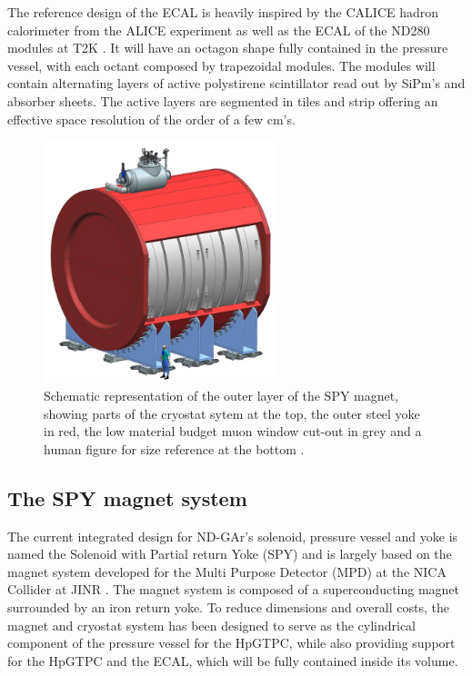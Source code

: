The reference design of the ECAL is heavily inspired by the CALICE hadron calorimeter from the ALICE experiment \cite{CALICE:2010fpb} as well as the ECAL of the ND280 modules at T2K \cite{T2KUK:2013wkh}. It will have an octagon shape fully contained in the pressure vessel, with each octant composed by trapezoidal modules. The modules will contain alternating layers of active polystirene scintillator read out by SiPm's and absorber sheets. The active layers are segmented in tiles and strip offering an effective space resolution of the order of a few cm's.

\begin{figure}[t]
     \centering
     \includegraphics[width=0.6\textwidth]{figures/ch3-DUNE/Spy.jpg}
     \caption[Schematic representation of the outer layer of the SPY magnet]{Schematic representation of the outer layer of the SPY magnet, showing parts of the cryostat sytem at the top, the outer steel yoke in red, the low material budget muon window cut-out in grey and a human figure for size reference at the bottom \cite{Bersani:2023rlw}.}
        \label{fig:Spy}
\end{figure}

\subsection{The SPY magnet system}
\label{Sec:SPY}
The current integrated design for ND-GAr's solenoid, pressure vessel and yoke is named the Solenoid with Partial return Yoke (SPY) \cite{Bersani:2023rlw} and is largely based on the magnet system developed for the Multi Purpose Detector (MPD) at the NICA Collider at JINR \cite{Golovatyuk:2016zps}. The magnet system is composed of a superconducting magnet surrounded by an iron return yoke. To reduce dimensions and overall costs, the magnet and cryostat system has been designed to serve as the cylindrical component of the pressure vessel for the HpGTPC, while also providing support for the HpGTPC and the ECAL, which will be fully contained inside its volume.

